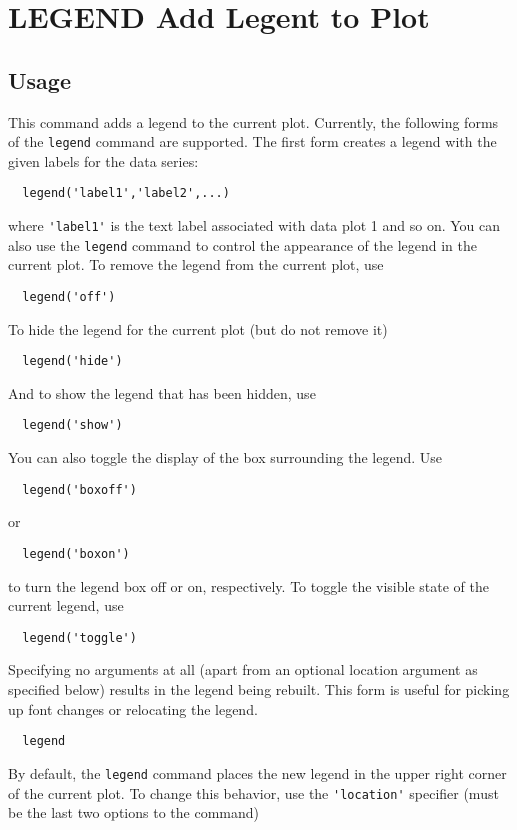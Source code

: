 \section{LEGEND Add Legent to Plot}

\subsection{Usage}

This command adds a legend to the current plot.  Currently, the
following forms of the \verb|legend| command are supported.  The
first form creates a legend with the given labels for the data
series:
\begin{verbatim}
  legend('label1','label2',...)
\end{verbatim}
where \verb|'label1'| is the text label associated with data plot 1
and so on.  You can also use the \verb|legend| command to control
the appearance of the legend in the current plot.  To remove the
legend from the current plot, use
\begin{verbatim}
  legend('off')
\end{verbatim}
To hide the legend for the current plot (but do not remove it)
\begin{verbatim}
  legend('hide')
\end{verbatim}
And to show the legend that has been hidden, use
\begin{verbatim}
  legend('show')
\end{verbatim}
You can also toggle the display of the box surrounding the legend.
Use
\begin{verbatim}
  legend('boxoff')
\end{verbatim}
or 
\begin{verbatim}
  legend('boxon')
\end{verbatim}
to turn the legend box off or on, respectively.  To toggle the
visible state of the current legend, use
\begin{verbatim}
  legend('toggle')
\end{verbatim}
Specifying no arguments at all (apart from an optional location 
argument as specified below) results in the legend being rebuilt.
This form is useful for picking up font changes or relocating the
legend.
\begin{verbatim}
  legend
\end{verbatim}
By default, the \verb|legend| command places the new legend in the 
upper right corner of the current plot.  To change this behavior,
use the \verb|'location'| specifier (must be the last two options to the command)
